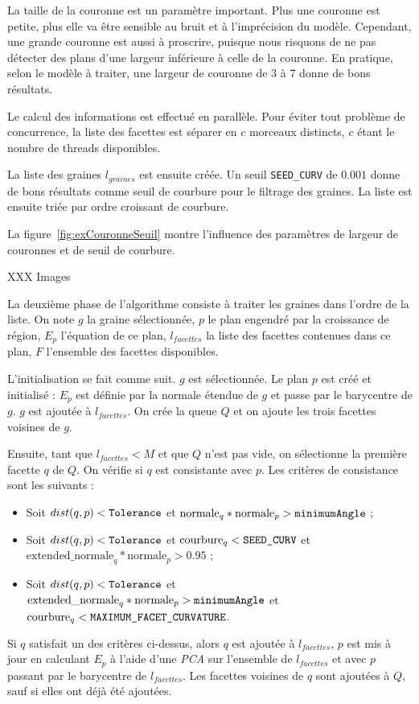 \documentclass[12pt, twoside]{article}
\begin{document}
La taille de la couronne est un paramètre important. Plus une couronne est petite, plus elle va être sensible au bruit et à l'imprécision du modèle. Cependant, une grande couronne est aussi à proscrire, puisque nous risquons de ne pas détecter des plans d'une largeur inférieure à celle de la couronne. En pratique, selon le modèle à traiter, une largeur de couronne de 3 à 7 donne de bons résultats.

Le calcul des informations est effectué en parallèle. Pour éviter tout problème de concurrence, la liste des facettes est séparer en $c$ morceaux distincts, $c$ étant le nombre de threads disponibles.

La liste des graines $l_{graines}$ est ensuite créée. Un seuil \texttt{SEED\_CURV} de $0.001$ donne de bons résultats comme seuil de courbure pour le filtrage des graines. La liste est ensuite triée par ordre croissant de courbure.

La figure~\ref{fig:exCouronneSeuil} montre l'influence des paramètres de largeur de couronnes et de seuil de courbure.

XXX Images

La deuxième phase de l'algorithme consiste à traiter les graines dans l'ordre de la liste. On note $g$ la graine sélectionnée, $p$ le plan engendré par la croissance de région, $E_p$ l'équation de ce plan, $l_{facettes}$ la liste des facettes contenues dans ce plan, $F$ l'ensemble des facettes disponibles.

L'initialisation se fait comme suit. $g$ est sélectionnée. Le plan $p$ est créé et initialisé : $E_p$ est définie par la normale étendue de $g$ et passe par le barycentre de $g$. $g$ est ajoutée à $l_{facettes}$. On crée la queue $Q$ et on ajoute les trois facettes voisines de $g$.

Ensuite, tant que $l_{facettes} < M$ et que $Q$ n'est pas vide, on sélectionne la première facette $q$ de $Q$. On vérifie si $q$ est consistante avec $p$. Les critères de consistance sont les suivants :
\begin{itemize}
  \item Soit $dist(q, p) < \text{\texttt{Tolerance}}$ et $\text{normale}_q * \text{normale}_p > \text{\texttt{minimumAngle}}$ ;
  \item Soit $dist(q, p) < \text{\texttt{Tolerance}}$ et $\text{courbure}_q < \text{\texttt{SEED\_CURV}}$ et $\text{extended\_normale}_q * \text{normale}_p > 0.95$ ;
  \item Soit $dist(q, p) < \text{\texttt{Tolerance}}$ et $\text{extended\_normale}_q * \text{normale}_p > \text{\texttt{minimumAngle}}$ et $\text{courbure}_q < \text{\texttt{MAXIMUM\_FACET\_CURVATURE}}$.
\end{itemize}
Si $q$ satisfait un des critères ci-dessus, alors $q$ est ajoutée à $l_{facettes}$, $p$ est mis à jour en calculant $E_p$ à l'aide d'une \textit{PCA} sur l'ensemble de $l_{facettes}$ et avec $p$ passant par le barycentre de $l_{facettes}$. Les facettes voisines de $q$ sont ajoutées à $Q$, sauf si elles ont déjà été ajoutées.
\end{document}
